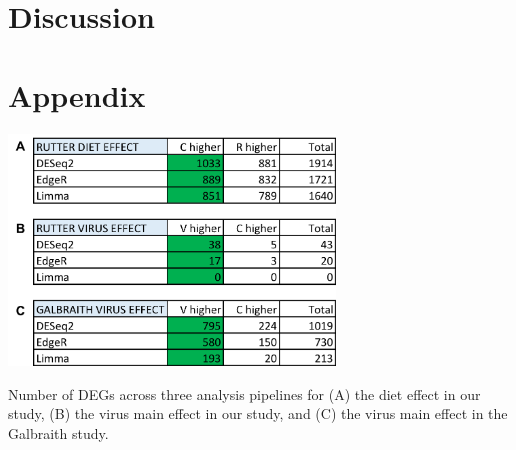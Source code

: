 \documentclass[11pt,a4paper,oldfontcommands,openany]{memoir}
\numberwithin{equation}{section} %
\begin{document}
\section{Discussion}








\section{Appendix}

\begin{table}[H]
  \includegraphics[width=0.65\textwidth]{Images/mainEffectDEGs}
  \caption{Number of DEGs across three analysis pipelines for (A) the diet effect in our study, (B) the virus main effect in our study, and (C) the virus main effect in the Galbraith study.}
  \label{tbl:mainEffectDEGs}
\end{table}
\end{document}
